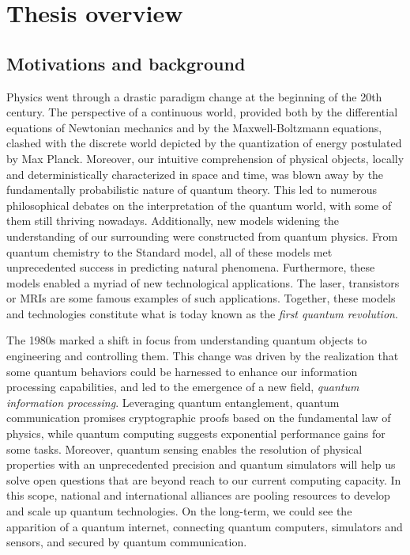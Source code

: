\chapter{Thesis overview}

\section{Motivations and background}

Physics went through a drastic paradigm change at the beginning of the 20th century.
The perspective of a continuous world, provided both by the differential equations of Newtonian mechanics and by the Maxwell-Boltzmann equations, clashed with the discrete world depicted by the quantization of energy postulated by Max Planck.
Moreover, our intuitive comprehension of physical objects, locally and deterministically characterized in space and time, was blown away by the fundamentally probabilistic nature of quantum theory.
This led to numerous philosophical debates on the interpretation of the quantum world, with some of them still thriving nowadays.
Additionally, new models widening the understanding of our surrounding were constructed from quantum physics.
From quantum chemistry to the Standard model, all of these models met unprecedented success in predicting natural phenomena.
Furthermore, these models enabled a myriad of new technological applications.
The laser, transistors or MRIs are some famous examples of such applications.
Together, these models and technologies constitute what is today known as the \textit{first quantum revolution}.

\medbreak

The 1980s marked a shift in focus from understanding quantum objects to engineering and controlling them.
This change was driven by the realization that some quantum behaviors could be harnessed to enhance our information processing capabilities, and led to the emergence of a new field, \textit{quantum information processing}.
Leveraging quantum entanglement, quantum communication promises cryptographic proofs based on the fundamental law of physics, while quantum computing suggests exponential performance gains for some tasks.
Moreover, quantum sensing enables the resolution of physical properties with an unprecedented precision and quantum simulators will help us solve open questions that are beyond reach to our current computing capacity. 
In this scope, national and international alliances are pooling resources to develop and scale up quantum technologies.
On the long-term, we could see the apparition of a quantum internet, connecting quantum computers, simulators and sensors, and secured by quantum communication.


